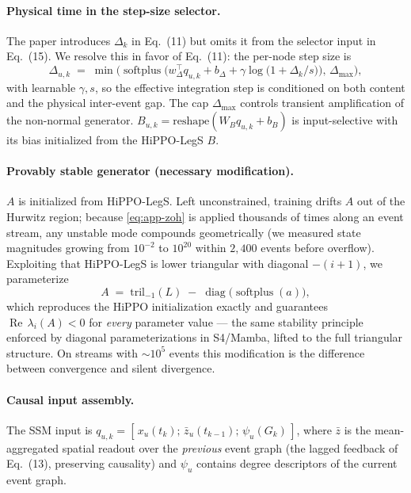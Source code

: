 \paragraph{Physical time in the step-size selector.}
The paper introduces $\Delta_k$ in Eq.~(11) but omits it from the
selector input in Eq.~(15). We resolve this in favor of Eq.~(11): the
per-node step size is
\begin{equation}
\Delta_{u,k} \;=\;
\min\!\Big(\operatorname{softplus}\big(w_\Delta^\top q_{u,k} + b_\Delta
+ \gamma \log\!\big(1 + \Delta_k / s\big)\big),\, \Delta_{\max}\Big),
\end{equation}
with learnable $\gamma, s$, so the effective integration step is
conditioned on both content and the physical inter-event gap. The cap
$\Delta_{\max}$ controls transient amplification of the non-normal
generator. $B_{u,k}=\mathrm{reshape}(W_B q_{u,k}+b_B)$ is
input-selective with its bias initialized from the HiPPO-LegS $B$.

\paragraph{Provably stable generator (necessary modification).}
$A$ is initialized from HiPPO-LegS. Left unconstrained, training
drifts $A$ out of the Hurwitz region; because
\eqref{eq:app-zoh} is applied thousands of times along an event
stream, any unstable mode compounds geometrically (we measured state
magnitudes growing from $10^{-2}$ to $10^{20}$ within $2{,}400$
events before overflow). Exploiting that HiPPO-LegS is lower
triangular with diagonal $-(i{+}1)$, we parameterize
\begin{equation}
A \;=\; \mathrm{tril}_{-1}(L) \;-\;
\operatorname{diag}\big(\operatorname{softplus}(a)\big),
\end{equation}
which reproduces the HiPPO initialization exactly and guarantees
$\operatorname{Re}\,\lambda_i(A) < 0$ for \emph{every} parameter
value --- the same stability principle enforced by diagonal
parameterizations in S4/Mamba, lifted to the full triangular
structure. On streams with $\sim$$10^5$ events this modification is
the difference between convergence and silent divergence.

\paragraph{Causal input assembly.}
The SSM input is $q_{u,k} = [\,x_u(t_k);\, \bar z_u(t_{k-1});\,
\psi_u(G_k)\,]$, where $\bar z$ is the mean-aggregated spatial
readout over the \emph{previous} event graph (the lagged feedback of
Eq.~(13), preserving causality) and $\psi_u$ contains degree
descriptors of the current event graph.

